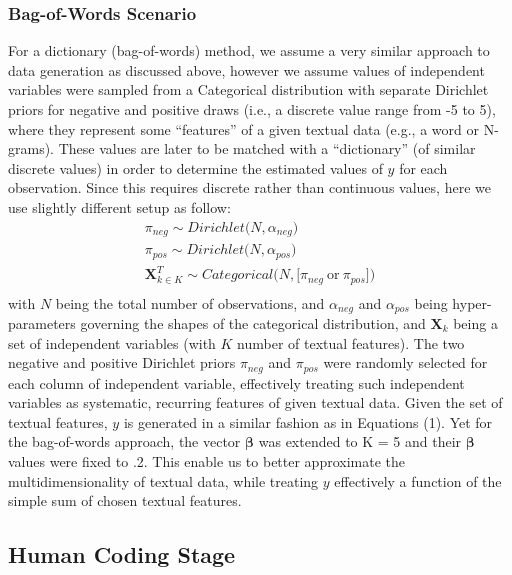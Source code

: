 \documentclass[man, 12pt, a4paper, nolmodern, noextraspace]{apa6}
\begin{document}
    \subsubsection{Bag-of-Words Scenario}
     For a dictionary (bag-of-words) method, we assume a very similar approach to data generation as discussed above, however we assume values of independent variables were sampled from a Categorical distribution with separate Dirichlet priors for negative and positive draws (i.e., a discrete value range from -5 to 5), where they represent some \enquote{features} of a given textual data (e.g., a word or N-grams). These values are later to be matched with a \enquote{dictionary} (of similar discrete values) in order to determine the estimated values of $y$ for each observation. Since this requires discrete rather than continuous values, here we use slightly different setup as follow:
       \begin{equation}
        \begin{gathered}
            \pi_{neg} \sim Dirichlet\bigl(N, \alpha_{neg}\bigr) \\
            \pi_{pos} \sim Dirichlet\bigl(N, \alpha_{pos}\bigr) \\
            \boldsymbol{X}_{k \in K}^T \sim Categorical\bigl(N, \bigl[\pi_{neg}\ \textrm{or}\ \pi_{pos}\bigr]\bigr) \\
        \end{gathered}
    \end{equation}
    \noindent with $N$ being the total number of observations, and $\alpha_{neg}$ and $\alpha_{pos}$ being hyper-parameters governing the shapes of the categorical distribution, and $\boldsymbol{X}_k$ being a set of independent variables (with $K$ number of textual features). The two negative and positive Dirichlet priors $\pi_{neg}$ and $\pi_{pos}$ were randomly selected for each column of independent variable, effectively treating such independent variables as systematic, recurring features of given textual data. Given the set of textual features, $y$ is generated in a similar fashion as in Equations (1). Yet for the bag-of-words approach, the vector $\boldsymbol{\beta}$ was extended to K = 5 and their $\boldsymbol{\beta}$ values were fixed to .2. This enable us to better approximate the multidimensionality of textual data, while treating $y$ effectively a function of the simple sum of chosen textual features. 

    \subsection{Human Coding Stage}
    
\end{document}
